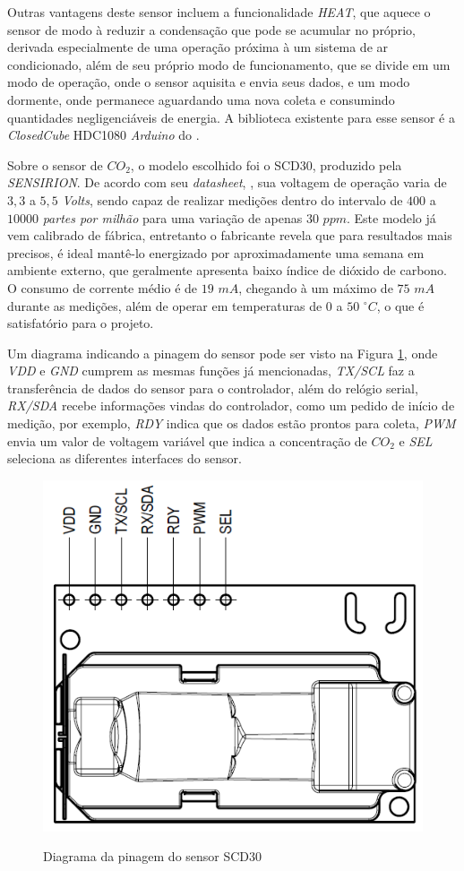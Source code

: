 \documentclass[acronym,symbols,table]{fei}
\begin{document}
Outras vantagens deste sensor incluem a funcionalidade \textit{HEAT}, que aquece o sensor de modo à reduzir a condensação que pode se acumular no próprio, derivada especialmente de uma operação próxima à um sistema de ar condicionado, além de seu próprio modo de funcionamento, que se divide em um modo de operação, onde o sensor aquisita e envia seus dados, e um modo dormente, onde permanece aguardando uma nova coleta e consumindo quantidades negligenciáveis de energia. A biblioteca existente para esse sensor é a \textit{ClosedCube} HDC1080 \textit{Arduino} do \textcite{ClosedCubeHDC1080}.

Sobre o sensor de ${CO}_{2}$, o modelo escolhido foi o SCD30, produzido pela \textit{SENSIRION}. De acordo com seu \textit{datasheet}, \textcite{SCD30}, sua voltagem de operação varia de $3,3$ a $5,5$ \textit{Volts}, sendo capaz de realizar medições dentro do intervalo de $400$ a $10000$ \textit{partes por milhão} para uma variação de apenas $30$ $ppm$. Este modelo já vem calibrado de fábrica, entretanto o fabricante revela que para resultados mais precisos, é ideal mantê-lo energizado por aproximadamente uma semana em ambiente externo, que geralmente apresenta baixo índice de dióxido de carbono. O consumo de corrente médio é de $19$ $mA$, chegando à um máximo de $75$ $mA$ durante as medições, além de operar em temperaturas de $0$ a $50$ $^{\circ}C$, o que é satisfatório para o projeto. 

Um diagrama indicando a pinagem do sensor pode ser visto na Figura \ref{fig:PinCO2}, onde \textit{VDD} e \textit{GND} cumprem as mesmas funções já mencionadas, \textit{TX/SCL} faz a transferência de dados do sensor para o controlador, além do relógio serial, \textit{RX/SDA} recebe informações vindas do controlador, como um pedido de início de medição, por exemplo, \textit{RDY} indica que os dados estão prontos para coleta, \textit{PWM} envia um valor de voltagem variável que indica a concentração de ${CO}_{2}$ e \textit{SEL} seleciona as diferentes interfaces do sensor.

\begin{figure}[!htb]
\centering
    \caption{Diagrama da pinagem do sensor SCD30}
    \includegraphics[width=0.5\linewidth]{Imagens/PinCO2.png}
    \label{fig:PinCO2}
\end{figure}
\end{document}
